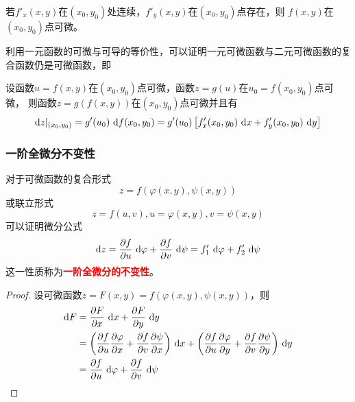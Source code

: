 \begin{theorem}
    若$f'_x(x,y)$在$(x_0,y_0)$处连续，$f'_y(x,y)$在$(x_0,y_0)$点存在，则
    $f(x,y)$在$(x_0,y_0)$点可微。
\end{theorem}

利用一元函数的可微与可导的等价性，可以证明一元可微函数与二元可微函数的复合函数仍是可微函数，即
\begin{theorem}
    设函数$u=f(x,y)$在$(x_0,y_0)$点可微，函数$z=g(u)$在$u_0=f(x_0,y_0)$点可微，
    则函数$z=g(f(x,y))$在$(x_0,y_0)$点可微并且有
    \[ \mathop{}\!\mathrm{d} z|_{(x_0,y_0)} = g'(u_0)\,\mathop{}\!\mathrm{d} f(x_0,y_0) = g'(u_0)\left[f'_x(x_0,y_0)\,\mathop{}\!\mathrm{d} x + f'_y(x_0,y_0)\,\mathop{}\!\mathrm{d} y\right] \]
\end{theorem}

\subsubsection{一阶全微分不变性}
对于可微函数的复合形式
\[ z= f(\varphi(x,y),\psi(x,y)) \]
或联立形式
\[ z = f(u,v), u=\varphi(x,y), v=\psi(x,y) \]
可以证明微分公式
\begin{equation}
    \mathop{}\!\mathrm{d} z
    = \frac{\partial f}{\partial u}\,\mathop{}\!\mathrm{d} \varphi + \frac{\partial f}{\partial v}\,\mathop{}\!\mathrm{d} \psi
    = f'_1\,\mathop{}\!\mathrm{d} \varphi + f'_2\,\mathop{}\!\mathrm{d} \psi
\end{equation}
这一性质称为\textcolor{red}{\textbf{\textsf{一阶全微分的不变性}}}。
\begin{proof}
    设可微函数$z=F(x,y) = f(\varphi(x,y), \psi(x,y))$，则
    \begin{align*}
        \mathop{}\!\mathrm{d} F & = \frac{\partial F}{\partial x}\,\mathop{}\!\mathrm{d} x + \frac{\partial F}{\partial y}\,\mathop{}\!\mathrm{d} y                                                                      \\
                & = \left(\frac{\partial f}{\partial u}\frac{\partial\varphi}{\partial x} + \frac{\partial f}{\partial v}\frac{\partial\psi}{\partial x}\right)\,\mathop{}\!\mathrm{d} x
        +\left(\frac{\partial f}{\partial u}\frac{\partial\varphi}{\partial y} + \frac{\partial f}{\partial v}\frac{\partial\psi}{\partial y}\right)\,\mathop{}\!\mathrm{d} y            \\
                & =\frac{\partial f}{\partial u}\,\mathop{}\!\mathrm{d} \varphi + \frac{\partial f}{\partial v}\,\mathop{}\!\mathrm{d} \psi
    \end{align*}
\end{proof}

